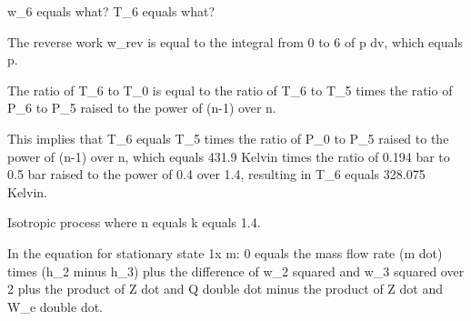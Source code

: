 w_6 equals what? T_6 equals what?

The reverse work w_rev is equal to the integral from 0 to 6 of p dv, which equals p.

The ratio of T_6 to T_0 is equal to the ratio of T_6 to T_5 times the ratio of P_6 to P_5 raised to the power of (n-1) over n.

This implies that T_6 equals T_5 times the ratio of P_0 to P_5 raised to the power of (n-1) over n, which equals 431.9 Kelvin times the ratio of 0.194 bar to 0.5 bar raised to the power of 0.4 over 1.4, resulting in T_6 equals 328.075 Kelvin.

Isotropic process where n equals k equals 1.4.

In the equation for stationary state 1x m:
0 equals the mass flow rate (m dot) times (h_2 minus h_3) plus the difference of w_2 squared and w_3 squared over 2 plus the product of Z dot and Q double dot minus the product of Z dot and W_e double dot.